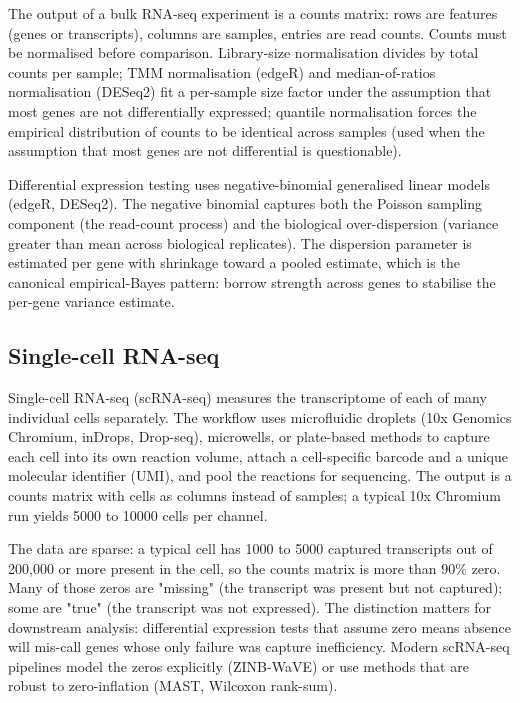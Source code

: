 The output of a bulk RNA-seq experiment is a counts matrix: rows are
features (genes or transcripts), columns are samples, entries are read
counts. Counts must be normalised before comparison. Library-size
normalisation divides by total counts per sample; TMM normalisation
(edgeR) and median-of-ratios normalisation (DESeq2) fit a per-sample
size factor under the assumption that most genes are not differentially
expressed; quantile normalisation forces the empirical distribution of
counts to be identical across samples (used when the assumption that
most genes are not differential is questionable).

Differential expression testing uses negative-binomial generalised
linear models (edgeR, DESeq2). The negative binomial captures both the
Poisson sampling component (the read-count process) and the
biological over-dispersion (variance greater than mean across
biological replicates). The dispersion parameter is estimated per
gene with shrinkage toward a pooled estimate, which is the canonical
empirical-Bayes pattern: borrow strength across genes to stabilise the
per-gene variance estimate.

\subsection{Single-cell RNA-seq}

Single-cell RNA-seq (scRNA-seq) measures the transcriptome of each of
many individual cells separately. The workflow uses microfluidic
droplets (10x Genomics Chromium, inDrops, Drop-seq), microwells, or
plate-based methods to capture each cell into its own reaction volume,
attach a cell-specific barcode and a unique molecular identifier
(UMI), and pool the reactions for sequencing. The output is a counts
matrix with cells as columns instead of samples; a typical 10x
Chromium run yields 5000 to 10000 cells per channel.

The data are sparse: a typical cell has 1000 to 5000 captured
transcripts out of 200,000 or more present in the cell, so the counts
matrix is more than $90\%$ zero. Many of those zeros are "missing"
(the transcript was present but not captured); some are "true"
(the transcript was not expressed). The distinction matters for
downstream analysis: differential expression tests that assume zero
means absence will mis-call genes whose only failure was capture
inefficiency. Modern scRNA-seq pipelines model the zeros explicitly
(ZINB-WaVE) or use methods that are robust to zero-inflation (MAST,
Wilcoxon rank-sum).

